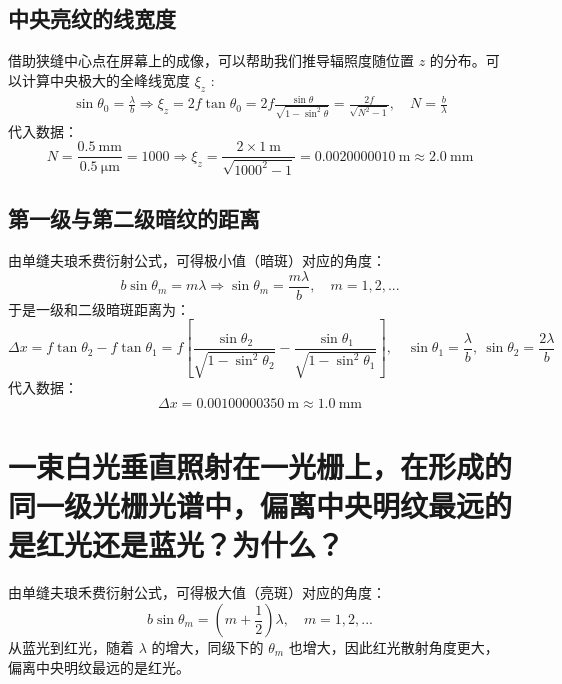 \documentclass[UTF8]{report}
\theoremstyle{MyLineTheoremStyle} %
\theoremstyle{MyBlockTheoremStyle} %
\theoremstyle{MySubsubsectionStyle} %
\begin{document}
\subsection{中央亮纹的线宽度}
借助狭缝中心点在屏幕上的成像，可以帮助我们推导辐照度随位置 $z$ 的分布。可以计算中央极大的全峰线宽度 $\xi_z$ : 
\begin{gather}
    \sin \theta_0 = \frac{\lambda}{b} \Longrightarrow \xi_z = 2 f \tan \theta_0 = 2f\frac{\sin \theta}{\sqrt{1 - \sin^2 \theta}} = \frac{2f}{\sqrt{N^2 - 1}},\quad N = \frac{b}{\lambda}
\end{gather}
代入数据：
\begin{equation}
N = \frac{0.5 \ \mathrm{mm}}{0.5 \ \mathrm{\mu m}} = 1000 \Longrightarrow \xi_z = \frac{2 \times 1 \ \mathrm{m}}{\sqrt{1000^2 - 1}} = 0.0020000010 \ \mathrm{m} \approx 2.0 \ \mathrm{mm}
\end{equation}

\subsection{第一级与第二级暗纹的距离}
由单缝夫琅禾费衍射公式，可得极小值（暗斑）对应的角度：
\begin{equation}
b\sin \theta_m = m\lambda \Longrightarrow \sin \theta_m = \frac{m\lambda}{b},\quad m = 1, 2, ...
\end{equation}
于是一级和二级暗斑距离为：
\begin{equation}
\Delta x = f\tan \theta_2 - f \tan \theta_1 = f\left[ \frac{\sin \theta_2}{\sqrt{1 - \sin^2 \theta_2}} - \frac{\sin \theta_1}{\sqrt{1 - \sin^2 \theta_1}} \right],\quad \sin \theta_1 = \frac{\lambda}{b},\ \sin \theta_2 = \frac{2\lambda}{b}
\end{equation}
代入数据：
\begin{equation}
    \Delta x = 0.00100000350 \ \mathrm{m} \approx 1.0 \ \mathrm{mm}
\end{equation}

\section{一束白光垂直照射在一光栅上，在形成的同一级光栅光谱中，偏离中央明纹最远的是红光还是蓝光？为什么？}
\vspace*{-3mm}
由单缝夫琅禾费衍射公式，可得极大值（亮斑）对应的角度：
\begin{equation}
b\sin \theta_m = \left(m + \frac{1}{2}\right)\lambda,\quad m = 1, 2, ...
\end{equation}
从蓝光到红光，随着 $\lambda$ 的增大，同级下的 $\theta_m$ 也增大，因此红光散射角度更大，偏离中央明纹最远的是红光。
\end{document}
